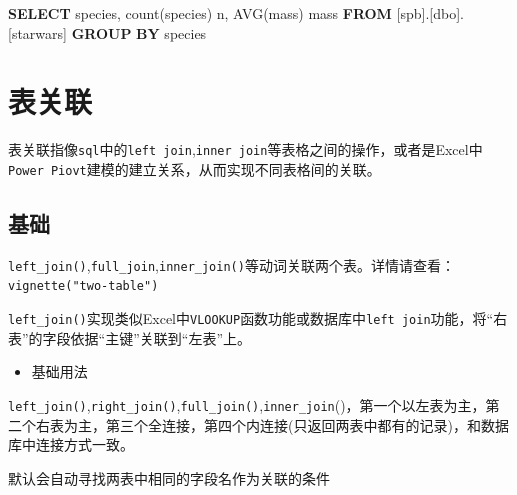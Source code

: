 \documentclass[
]{book}
\newenvironment{Shaded}{\begin{snugshade}}{\end{snugshade}}
\newcommand{\FunctionTok}[1]{\textcolor[rgb]{0.00,0.00,0.00}{#1}}
\newcommand{\KeywordTok}[1]{\textcolor[rgb]{0.13,0.29,0.53}{\textbf{#1}}}
\newcommand{\NormalTok}[1]{#1}
\providecommand{\tightlist}{%
  \setlength{\itemsep}{0pt}\setlength{\parskip}{0pt}}
\begin{document}
\begin{Shaded}
\begin{Highlighting}[]
\KeywordTok{SELECT}\NormalTok{ species,}
  \FunctionTok{count}\NormalTok{(species) n,}
  \FunctionTok{AVG}\NormalTok{(mass) mass}
\KeywordTok{FROM}\NormalTok{ [spb].[dbo].[starwars]}
\KeywordTok{GROUP} \KeywordTok{BY}\NormalTok{  species}
\end{Highlighting}
\end{Shaded}

\hypertarget{dplyr:merge-table}{%
\section{表关联}\label{dplyr:merge-table}}

表关联指像\texttt{sql}中的\texttt{left\ join},\texttt{inner\ join}等表格之间的操作，或者是Excel中\texttt{Power\ Piovt}建模的建立关系，从而实现不同表格间的关联。

\hypertarget{ux57faux7840}{%
\subsection{基础}\label{ux57faux7840}}

\texttt{left\_join()},\texttt{full\_join},\texttt{inner\_join()}等动词关联两个表。详情请查看：\texttt{vignette("two-table")}

\texttt{left\_join()}实现类似Excel中\texttt{VLOOKUP}函数功能或数据库中\texttt{left\ join}功能，将``右表''的字段依据``主键''关联到``左表''上。

\begin{itemize}
\tightlist
\item
  基础用法
\end{itemize}

\texttt{left\_join()},\texttt{right\_join()},\texttt{full\_join()},\texttt{inner\_join}()，第一个以左表为主，第二个右表为主，第三个全连接，第四个内连接(只返回两表中都有的记录)，和数据库中连接方式一致。

默认会自动寻找两表中相同的字段名作为关联的条件
\end{document}
